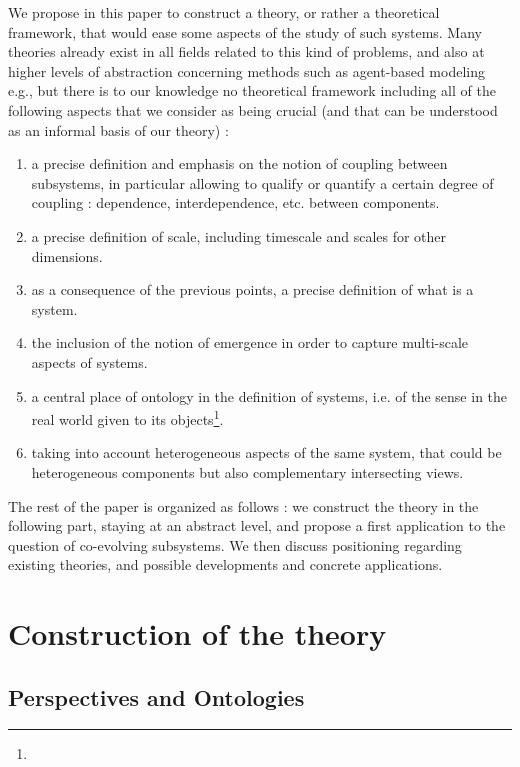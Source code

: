 We propose in this paper to construct a theory, or rather a theoretical framework, that would ease some aspects of the study of such systems. Many theories already exist in all fields related to this kind of problems, and also at higher levels of abstraction concerning methods such as agent-based modeling e.g., but there is to our knowledge no theoretical framework including all of the following aspects that we consider as being crucial (and that can be understood as an informal basis of our theory) :
\begin{enumerate}
\item a precise definition and emphasis on the notion of coupling between subsystems, in particular allowing to qualify or quantify a certain degree of coupling : dependence, interdependence, etc. between components.
\item a precise definition of scale, including timescale and scales for other dimensions.
\item as a consequence of the previous points, a precise definition of what is a system.
\item the inclusion of the notion of emergence in order to capture multi-scale aspects of systems.
\item a central place of ontology in the definition of systems, i.e. of the sense in the real world given to its objects\footnote{%
}.
\item taking into account heterogeneous aspects of the same system, that could be heterogeneous components but also complementary intersecting views.
\end{enumerate}


The rest of the paper is organized as follows : we construct the theory in the following part, staying at an abstract level, and propose a first application to the question of co-evolving subsystems. We then discuss positioning regarding existing theories, and possible developments and concrete applications.


\section*{Construction of the theory}

\subsection*{Perspectives and Ontologies}

